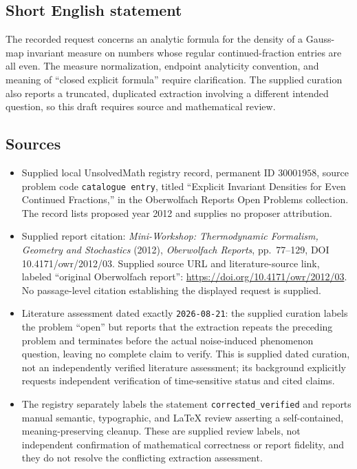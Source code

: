 \documentclass[11pt]{article}
\begin{document}
\subsection{Short English statement}
The recorded request concerns an analytic formula for the density of a Gauss-map invariant measure on numbers whose regular continued-fraction entries are all even. The measure normalization, endpoint analyticity convention, and meaning of ``closed explicit formula'' require clarification. The supplied curation also reports a truncated, duplicated extraction involving a different intended question, so this draft requires source and mathematical review.
\subsection{Sources}
\begin{itemize}
\item Supplied local UnsolvedMath registry record, permanent ID \(30001958\), source problem code \texttt{catalogue entry}, titled ``Explicit Invariant Densities for Even Continued Fractions,'' in the Oberwolfach Reports Open Problems collection. The record lists proposed year 2012 and supplies no proposer attribution.
\item Supplied report citation: \emph{Mini-Workshop: Thermodynamic Formalism, Geometry and Stochastics} (2012), \emph{Oberwolfach Reports}, pp.~77--129, DOI 10.4171/owr/2012/03. Supplied source URL and literature-source link, labeled ``original Oberwolfach report'': \url{https://doi.org/10.4171/owr/2012/03}. No passage-level citation establishing the displayed request is supplied.
\item Literature assessment dated exactly \texttt{2026-08-21}: the supplied curation labels the problem ``open'' but reports that the extraction repeats the preceding problem and terminates before the actual noise-induced phenomenon question, leaving no complete claim to verify. This is supplied dated curation, not an independently verified literature assessment; its background explicitly requests independent verification of time-sensitive status and cited claims.
\item The registry separately labels the statement \texttt{corrected\_verified} and reports manual semantic, typographic, and LaTeX review asserting a self-contained, meaning-preserving cleanup. These are supplied review labels, not independent confirmation of mathematical correctness or report fidelity, and they do not resolve the conflicting extraction assessment.
\end{itemize}
\end{document}

